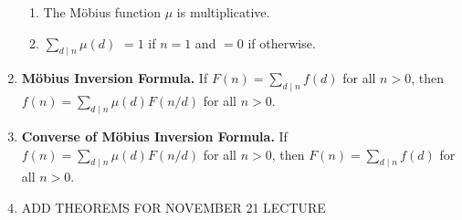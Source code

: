 \documentclass[11pt]{article}
\theoremstyle{definition}
\theoremstyle{named}
\begin{document}
\begin{enumerate}
    \begin{enumerate}
        \item The Möbius function $\mu$ is multiplicative. 
        \item $\sum_{d \mid n} \mu(d)$ $=1$ if $n=1$ and $=0$ if otherwise. 
    \end{enumerate}
    \item \textbf{Möbius Inversion Formula. } If $F(n) = \sum_{d \mid n} f(d)$ for all $n>0$, then $f(n) = \sum_{d \mid n} \mu(d)F(n/d)$ for all $n>0$. 
    \item \textbf{Converse of Möbius Inversion Formula. } If $f(n) = \sum_{d \mid n} \mu(d)F(n/d)$ for all $n>0$, then $F(n) = \sum_{d \mid n} f(d)$ for all $n>0$. 
    \item ADD THEOREMS FOR NOVEMBER 21 LECTURE
\end{enumerate}
\end{document}
